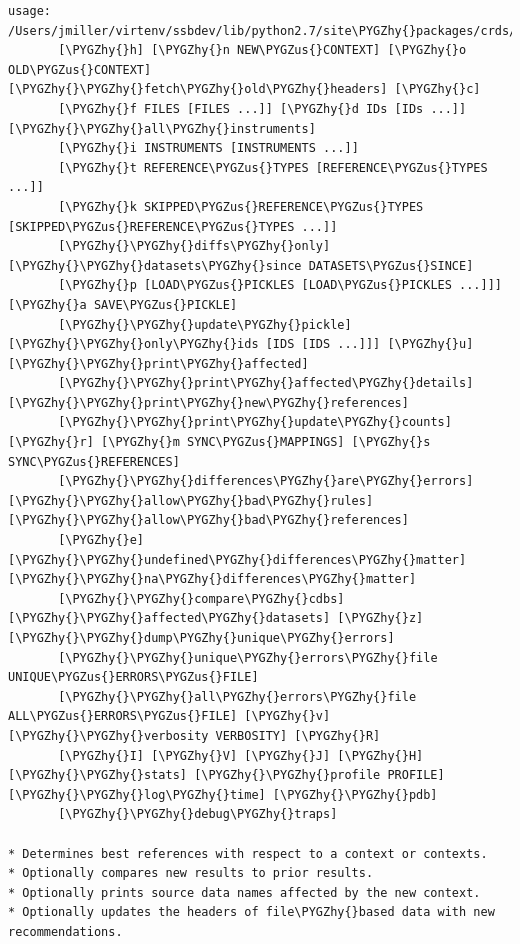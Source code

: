\documentclass[letterpaper,10pt,english]{sphinxmanual}
\def\PYGZus{\char`\_}
\def\PYGZhy{\char`\-}
\begin{document}
\begin{Verbatim}[commandchars=\\\{\}]
usage: /Users/jmiller/virtenv/ssbdev/lib/python2.7/site\PYGZhy{}packages/crds/bestrefs.py
       [\PYGZhy{}h] [\PYGZhy{}n NEW\PYGZus{}CONTEXT] [\PYGZhy{}o OLD\PYGZus{}CONTEXT] [\PYGZhy{}\PYGZhy{}fetch\PYGZhy{}old\PYGZhy{}headers] [\PYGZhy{}c]
       [\PYGZhy{}f FILES [FILES ...]] [\PYGZhy{}d IDs [IDs ...]] [\PYGZhy{}\PYGZhy{}all\PYGZhy{}instruments]
       [\PYGZhy{}i INSTRUMENTS [INSTRUMENTS ...]]
       [\PYGZhy{}t REFERENCE\PYGZus{}TYPES [REFERENCE\PYGZus{}TYPES ...]]
       [\PYGZhy{}k SKIPPED\PYGZus{}REFERENCE\PYGZus{}TYPES [SKIPPED\PYGZus{}REFERENCE\PYGZus{}TYPES ...]]
       [\PYGZhy{}\PYGZhy{}diffs\PYGZhy{}only] [\PYGZhy{}\PYGZhy{}datasets\PYGZhy{}since DATASETS\PYGZus{}SINCE]
       [\PYGZhy{}p [LOAD\PYGZus{}PICKLES [LOAD\PYGZus{}PICKLES ...]]] [\PYGZhy{}a SAVE\PYGZus{}PICKLE]
       [\PYGZhy{}\PYGZhy{}update\PYGZhy{}pickle] [\PYGZhy{}\PYGZhy{}only\PYGZhy{}ids [IDS [IDS ...]]] [\PYGZhy{}u] [\PYGZhy{}\PYGZhy{}print\PYGZhy{}affected]
       [\PYGZhy{}\PYGZhy{}print\PYGZhy{}affected\PYGZhy{}details] [\PYGZhy{}\PYGZhy{}print\PYGZhy{}new\PYGZhy{}references]
       [\PYGZhy{}\PYGZhy{}print\PYGZhy{}update\PYGZhy{}counts] [\PYGZhy{}r] [\PYGZhy{}m SYNC\PYGZus{}MAPPINGS] [\PYGZhy{}s SYNC\PYGZus{}REFERENCES]
       [\PYGZhy{}\PYGZhy{}differences\PYGZhy{}are\PYGZhy{}errors] [\PYGZhy{}\PYGZhy{}allow\PYGZhy{}bad\PYGZhy{}rules] [\PYGZhy{}\PYGZhy{}allow\PYGZhy{}bad\PYGZhy{}references]
       [\PYGZhy{}e] [\PYGZhy{}\PYGZhy{}undefined\PYGZhy{}differences\PYGZhy{}matter] [\PYGZhy{}\PYGZhy{}na\PYGZhy{}differences\PYGZhy{}matter]
       [\PYGZhy{}\PYGZhy{}compare\PYGZhy{}cdbs] [\PYGZhy{}\PYGZhy{}affected\PYGZhy{}datasets] [\PYGZhy{}z] [\PYGZhy{}\PYGZhy{}dump\PYGZhy{}unique\PYGZhy{}errors]
       [\PYGZhy{}\PYGZhy{}unique\PYGZhy{}errors\PYGZhy{}file UNIQUE\PYGZus{}ERRORS\PYGZus{}FILE]
       [\PYGZhy{}\PYGZhy{}all\PYGZhy{}errors\PYGZhy{}file ALL\PYGZus{}ERRORS\PYGZus{}FILE] [\PYGZhy{}v] [\PYGZhy{}\PYGZhy{}verbosity VERBOSITY] [\PYGZhy{}R]
       [\PYGZhy{}I] [\PYGZhy{}V] [\PYGZhy{}J] [\PYGZhy{}H] [\PYGZhy{}\PYGZhy{}stats] [\PYGZhy{}\PYGZhy{}profile PROFILE] [\PYGZhy{}\PYGZhy{}log\PYGZhy{}time] [\PYGZhy{}\PYGZhy{}pdb]
       [\PYGZhy{}\PYGZhy{}debug\PYGZhy{}traps]

* Determines best references with respect to a context or contexts.
* Optionally compares new results to prior results.
* Optionally prints source data names affected by the new context.
* Optionally updates the headers of file\PYGZhy{}based data with new recommendations.



\end{Verbatim}
\end{document}
